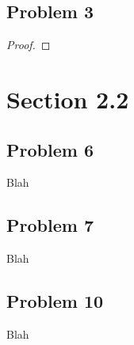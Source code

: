 \documentclass{article}
\begin{document}
\subsection*{Problem 3}
%
\begin{proof}
%
\end{proof}

\section*{Section 2.2}
%
\subsection*{Problem 6}
Blah
\subsection*{Problem 7}
Blah
\subsection*{Problem 10}
Blah
\end{document}
